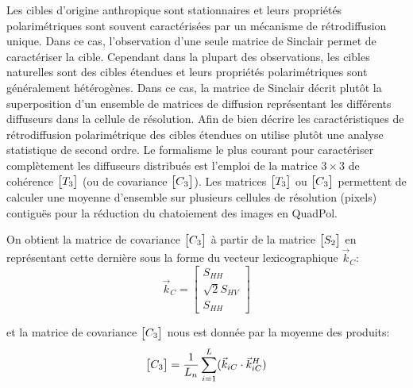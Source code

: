  
 
 
Les cibles d’origine anthropique sont stationnaires et leurs propriétés polarimétriques sont souvent caractérisées par un mécanisme de rétrodiffusion unique.  Dans ce cas,  l’observation d’une seule matrice de Sinclair permet de caractériser la cible.  Cependant dans la plupart des observations, les cibles naturelles sont des cibles étendues et leurs propriétés polarimétriques sont généralement hétérogènes.   Dans ce cas, la matrice de Sinclair décrit plutôt la superposition d'un ensemble de matrices de diffusion représentant les différents diffuseurs dans la cellule de résolution.  Afin de bien décrire les caractéristiques de rétrodiffusion polarimétrique des cibles étendues on utilise plutôt une analyse statistique de second ordre. Le formalisme le plus courant pour caractériser complètement les diffuseurs distribués est l'emploi de la matrice $3\times3$ de cohérence $\begin{bmatrix} T_3 \end{bmatrix}$ (ou de covariance $\begin{bmatrix} C_3 \end{bmatrix}$).  %
Les matrices $\begin{bmatrix} T_3 \end{bmatrix}$ ou $\begin{bmatrix} C_3 \end{bmatrix}$ permettent de calculer une moyenne d’ensemble sur
plusieurs cellules de résolution (pixels) contiguës pour la réduction du chatoiement des
images en QuadPol.

On obtient la matrice de covariance $\begin{bmatrix} C_3 \end{bmatrix}$ à partir de la matrice $\begin{bmatrix} S_2 \end{bmatrix}$ en représentant cette dernière sous la forme du vecteur lexicographique $\Vec{k}_C$:
 \begin{equation}
 \Vec{k}_C = \begin{bmatrix} S_{HH} \\ \sqrt{2}S_{HV}  \\  S_{HH}\end{bmatrix}
 \end{equation}
 
et la matrice de covariance  $\begin{bmatrix} C_3 \end{bmatrix}$ nous est donnée par la moyenne des produits:
 \begin{equation}
\begin{bmatrix} C_3 \end{bmatrix} = \frac{1}{L_n} \sum_{i=1}^{L}(\Vec{k}_{iC} \cdot \Vec{k}_{iC}^{H})
 \end{equation}
 
